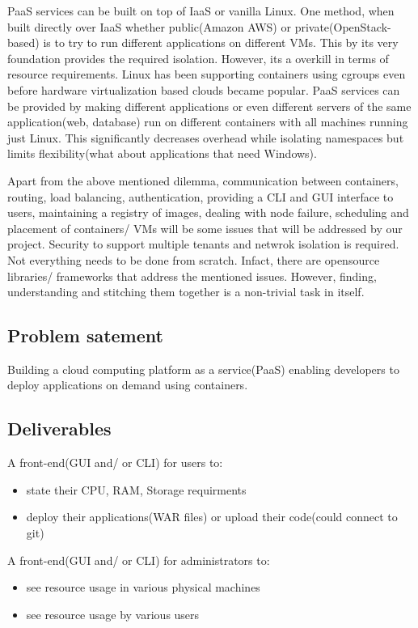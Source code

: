 \documentclass[a4paper]{article}
\begin{document}
  PaaS services can be built on top of IaaS or vanilla Linux. One method, when built directly over IaaS whether public(Amazon AWS) or private(OpenStack-based) is to try to run different applications on different VMs. This by its very foundation provides the required isolation. However, its a overkill in terms of resource requirements. Linux has been supporting containers using cgroups even before hardware virtualization based clouds became popular. PaaS services can be provided by making different applications or even different servers of the same application(web, database) run on different containers with all machines running just Linux. This significantly decreases overhead while isolating namespaces but limits flexibility(what about applications that need Windows). 
  
  Apart from the above mentioned dilemma, communication between containers, routing, load balancing, authentication, providing a CLI and GUI interface to users, maintaining a registry of images, dealing with node failure, scheduling and placement of containers/ VMs will be some issues that will be addressed by our project. Security to support multiple tenants and netwrok isolation is required. Not everything needs to be done from scratch. Infact, there are opensource libraries/ frameworks that address the mentioned issues. However, finding, understanding and stitching them together is a non-trivial task in itself.
  
  \subsection{Problem satement}
	
  Building a cloud computing platform as a service(PaaS) enabling developers to deploy applications on demand using containers.
	
  \subsection{Deliverables}

  A front-end(GUI and/ or CLI) for users to:
  \begin{itemize}
	  \item state their CPU, RAM, Storage requirments
	  \item deploy their applications(WAR files) or upload their code(could connect to git)
  \end{itemize}
  
  A front-end(GUI and/ or CLI) for administrators to:
  \begin{itemize}
	  \item see resource usage in various physical machines
	  \item see resource usage by various users
  \end{itemize}
  
\end{document}

